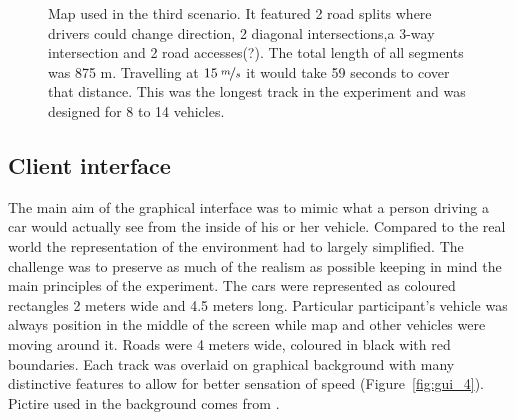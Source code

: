 \documentclass[11pt,english]{article}
\begin{document}
\begin{figure}[H] %
\caption{Map used in the third scenario. It featured 2 road splits where drivers could change direction, 2 diagonal intersections,a 3-way intersection and 2 road accesses(?). The total length of all segments was 875 m. Travelling at $15\:\nicefrac{m}{s}$ it would take 59 seconds to cover that distance. This was the longest track in the experiment and was designed for 8 to 14 vehicles.}
\label{fig:map_3_arrows}
\end{figure}



\subsection{Client interface}

The main aim of the graphical interface was to mimic what a person driving a car would actually see from the inside of his or her vehicle. Compared to the real world the representation of the environment had to largely simplified. The challenge was to preserve as much of the realism as possible keeping in mind the main principles of the experiment. The cars were represented as coloured rectangles 2 meters wide and 4.5 meters long. Particular participant's vehicle was always position in the middle of the screen while map and other vehicles were moving around it. Roads were 4 meters wide, coloured in black with red boundaries. Each track was overlaid on graphical background with many distinctive features to allow for better sensation of speed (Figure~\ref{fig:gui_4}). Pictire used in the background comes from \citet{sheerwood}.
\end{document}

